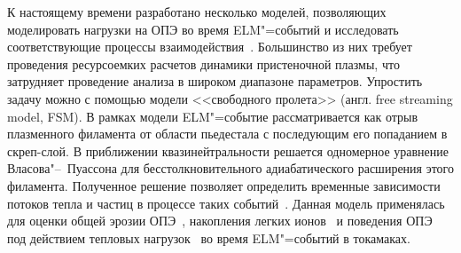 К настоящему времени разработано несколько моделей, позволяющих моделировать нагрузки на ОПЭ во время ELM"=событий и исследовать соответствующие процессы взаимодействия~\cite{Krieger2025,Leonard2014,zohm1996edge}. Большинство из них требует проведения ресурсоемких расчетов динамики пристеночной плазмы, что затрудняет проведение анализа в широком диапазоне параметров. Упростить задачу можно с помощью модели <<свободного пролета>> (англ. free streaming model, FSM). В рамках модели ELM"=событие рассматривается как отрыв плазменного филамента от области пьедестала с последующим его попаданием в скреп-слой. В приближении квазинейтральности решается одномерное уравнение Власова"--~Пуассона для бесстолкновительного адиабатического расширения этого филамента. Полученное решение позволяет определить временные зависимости потоков тепла и частиц в процессе таких событий~\cite{Fundamenski2006, Moulton2013}. Данная модель применялась для оценки общей эрозии ОПЭ~\cite{Abrams2018, Wang2024}, накопления легких ионов~\cite{Dasgupta2023} и поведения ОПЭ под действием тепловых нагрузок~\cite{VandenKerkhof2021} во время ELM"=событий в токамаках.

